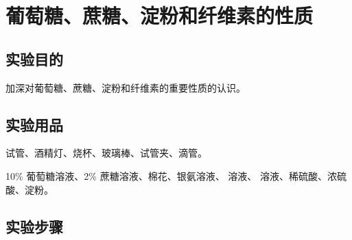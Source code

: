 \section{葡萄糖、蔗糖、淀粉和纤维素的性质}
\subsection*{实验目的}
加深对葡萄糖、蔗糖、淀粉和纤维素的重要性质的认识。

\subsection*{实验用品}
试管、酒精灯、烧杯、玻璃棒、试管夹、滴管。

10\% 葡萄糖溶液、2\% 蔗糖溶液、棉花、银氨溶液、 溶液、 溶液、稀硫酸、浓硫酸、淀粉。
\subsection*{实验步骤}
